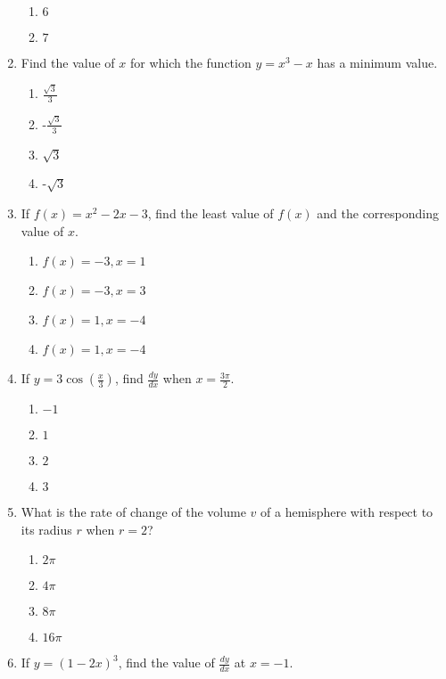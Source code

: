 \begin{enumerate}[label={\arabic*.}]
\begin{enumerate}[label={\Alph*.}]
            \item \(6\)
            \item \(7\)
        \end{enumerate}
  \item Find the value of \(x\) for which the function \(y = x^3 - x\) has a minimum value.
        \begin{enumerate}[label={\Alph*.}]
            \item \(\frac{\sqrt{3}}{3}\)
            \item -\(\frac{\sqrt{3}}{3}\)
            \item \(\sqrt{3}\)
            \item -\(\sqrt{3}\)
        \end{enumerate}
  \item If \(f(x) = x^2 - 2x - 3\), find the least value of \(f(x)\) and the corresponding value of \(x\).
        \begin{enumerate}[label={\Alph*.}]
            \item \(f(x) = -3, x = 1\)
            \item \(f(x) = -3, x = 3\)
            \item \(f(x) = 1, x = -4\)
            \item \(f(x) = 1, x = -4\)
        \end{enumerate}
  \item If \(y = 3 \cos\left(\frac{x}{3}\right)\), find \( \frac{dy}{dx} \) when \(x = \frac{3\pi}{2}\).
        \begin{enumerate}[label={\Alph*.}]
            \item \(-1\)
            \item \(1\)
            \item \(2\)
            \item  \(3\)
        \end{enumerate}
  \item What is the rate of change of the volume \(v\) of a hemisphere with respect to its radius \(r\) when \(r = 2\)?
        \begin{enumerate}[label={\Alph*.}]
            \item  \(2\pi\)
            \item  \(4\pi\)
            \item  \(8\pi\)
            \item  \(16\pi\)
        \end{enumerate}
  \item If \(y = (1-2x)^3\), find the value of \( \frac{dy}{dx} \) at \(x = -1\).

\end{enumerate}
